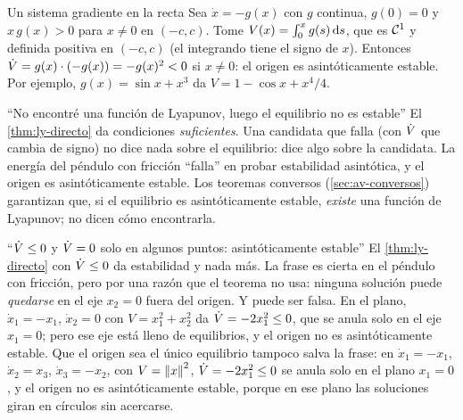 \begin{ejemplo}[label=ej:ly-gx]{Un sistema gradiente en la recta}
Sea $\dot x=-g(x)$ con $g$ continua, $g(0)=0$ y $x\,g(x)>0$ para $x\neq0$ en $(-c,c)$.
\solucion Tome $V(x)=\int_0^xg(s)\,\mathrm{d} s$, que es $\mathcal{C}^{1}$ y definida positiva en $(-c,c)$ (el integrando tiene el signo de $x$). Entonces $\dot V=g(x)\cdot(-g(x))=-g(x)^2<0$ si $x\neq0$: el origen es asintóticamente estable. Por ejemplo, $g(x)=\sin x+x^3$ da $V=1-\cos x+x^4/4$.
\end{ejemplo}


\begin{trampa}[label=tr:ly-suficiente]{``No encontré una función de Lyapunov, luego el equilibrio no es estable''}
El \cref{thm:ly-directo} da condiciones \emph{suficientes}. Una candidata que falla (con $\dot V$ que cambia de signo) no dice nada sobre el equilibrio: dice algo sobre la candidata. La energía del péndulo con fricción ``falla'' en probar estabilidad asintótica, y el origen es asintóticamente estable. Los teoremas conversos (\cref{sec:av-conversos}) garantizan que, si el equilibrio es asintóticamente estable, \emph{existe} una función de Lyapunov; no dicen cómo encontrarla.
\end{trampa}

\begin{trampa}[label=tr:ly-semidef]{``$\dot V\le0$ y $\dot V=0$ solo en algunos puntos: asintóticamente estable''}
El \cref{thm:ly-directo} con $\dot V\le0$ da estabilidad y nada más. La frase es cierta en el péndulo con fricción, pero por una razón que el teorema no usa: ninguna solución puede \emph{quedarse} en el eje $x_2=0$ fuera del origen. Y puede ser falsa. En el plano, $\dot x_1=-x_1$, $\dot x_2=0$ con $V=x_1^2+x_2^2$ da $\dot V=-2x_1^2\le0$, que se anula solo en el eje $x_1=0$; pero ese eje está lleno de equilibrios, y el origen no es asintóticamente estable. Que el origen sea el único equilibrio tampoco salva la frase: en $\dot x_1=-x_1$, $\dot x_2=x_3$, $\dot x_3=-x_2$, con $V=\left\lVert x\right\rVert^2$, $\dot V=-2x_1^2\le0$ se anula solo en el plano $x_1=0$, y el origen no es asintóticamente estable, porque en ese plano las soluciones giran en círculos sin acercarse.
\end{trampa}


